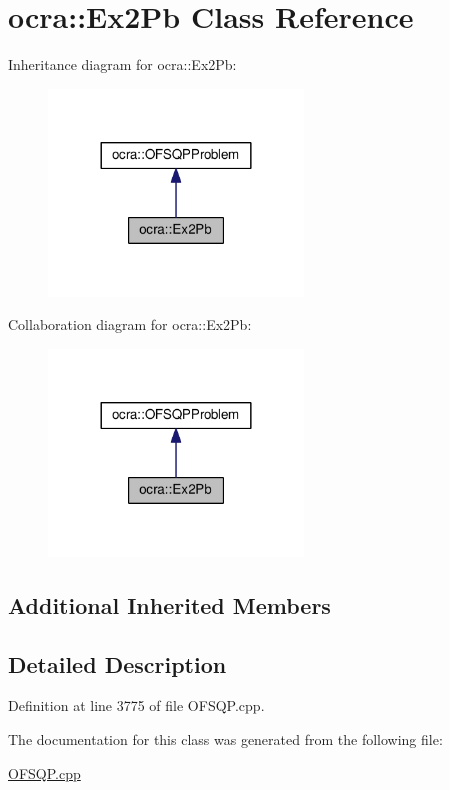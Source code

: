 \hypertarget{classocra_1_1Ex2Pb}{}\section{ocra\+:\+:Ex2\+Pb Class Reference}
\label{classocra_1_1Ex2Pb}


Inheritance diagram for ocra\+:\+:Ex2\+Pb\+:
\nopagebreak
\begin{figure}[H]
\begin{center}
\leavevmode
\includegraphics[width=192pt]{dc/de6/classocra_1_1Ex2Pb__inherit__graph}
\end{center}
\end{figure}


Collaboration diagram for ocra\+:\+:Ex2\+Pb\+:
\nopagebreak
\begin{figure}[H]
\begin{center}
\leavevmode
\includegraphics[width=192pt]{da/d9a/classocra_1_1Ex2Pb__coll__graph}
\end{center}
\end{figure}
\subsection*{Additional Inherited Members}


\subsection{Detailed Description}


Definition at line 3775 of file O\+F\+S\+Q\+P.\+cpp.



The documentation for this class was generated from the following file\+:\begin{DoxyCompactItemize}
\item 
\hyperlink{OFSQP_8cpp}{O\+F\+S\+Q\+P.\+cpp}\end{DoxyCompactItemize}
